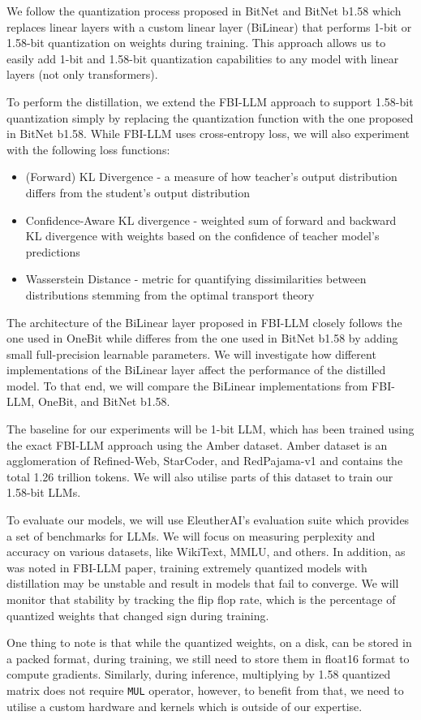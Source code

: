 \documentclass{article}
\begin{document}
 We follow the quantization process proposed in BitNet and BitNet b1.58 which replaces linear layers with a custom linear layer (BiLinear) that performs 1-bit or 1.58-bit quantization on weights during training. This approach allows us to easily add 1-bit and 1.58-bit quantization capabilities to any model with linear layers (not only transformers).

 To perform the distillation, we extend the FBI-LLM approach to support 1.58-bit quantization simply by replacing the quantization function with the one proposed in BitNet b1.58. While FBI-LLM uses cross-entropy loss, we will also experiment with the following loss functions:

\begin{itemize}
	\item (Forward) KL Divergence - a measure of how teacher's output distribution differs from the student's output distribution
	\item Confidence-Aware KL divergence - weighted sum of forward and backward KL divergence with weights based on the confidence of teacher model's predictions
	\item Wasserstein Distance - metric for quantifying dissimilarities between distributions stemming from the optimal transport theory
\end{itemize}

The architecture of the BiLinear layer proposed in FBI-LLM closely follows the one used in OneBit \cite{onebit} while differes from the one used in BitNet b1.58 by adding small full-precision learnable parameters. We will investigate how different implementations of the BiLinear layer affect the performance of the distilled model. To that end, we will compare the BiLinear implementations from FBI-LLM, OneBit, and BitNet b1.58.

The baseline for our experiments will be 1-bit LLM, which has been trained using the exact FBI-LLM approach using the Amber dataset. Amber dataset is an agglomeration of Refined-Web, StarCoder, and RedPajama-v1 and contains the total 1.26 trillion tokens. We will also utilise parts of this dataset to train our 1.58-bit LLMs.

To evaluate our models, we will use EleutherAI's evaluation suite which provides a set of benchmarks for LLMs. We will focus on measuring perplexity and accuracy on various datasets, like WikiText, MMLU, and others. In addition, as was noted in FBI-LLM paper, training extremely quantized models with distillation may be unstable and result in models that fail to converge. We will monitor that stability by tracking the flip flop rate, which is the percentage of quantized weights that changed sign during training.

One thing to note is that while the quantized weights, on a disk, can be stored in a packed format, during training, we still need to store them in float16 format to compute gradients. Similarly, during inference, multiplying by 1.58 quantized matrix does not require \verb|MUL| operator, however, to benefit from that, we need to utilise a custom hardware and kernels which is outside of our expertise.


\end{document}
